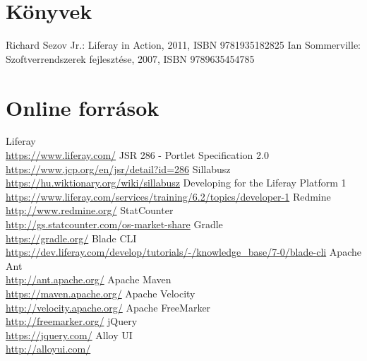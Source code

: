 \documentclass[hidelinks, 12pt, a4paper]{report}
\begin{document}

\clearpage
{}
\begin{thebibliography}{10}

\section*{Könyvek}

 Richard Sezov Jr.: Liferay in Action, 2011, ISBN 9781935182825
 Ian Sommerville: Szoftverrendszerek fejlesztése, 2007, ISBN 9789635454785

\section*{Online források}

 Liferay \\ \small\url{https://www.liferay.com/}
 JSR 286 - Portlet Specification 2.0 \\ \small\url{https://www.jcp.org/en/jsr/detail?id=286}
 Sillabusz \\ \small\url{https://hu.wiktionary.org/wiki/sillabusz}
 Developing for the Liferay Platform 1 \\ \small\url{https://www.liferay.com/services/training/6.2/topics/developer-1}
 Redmine \\ \small\url{http://www.redmine.org/}
 StatCounter \\ \small\url{http://gs.statcounter.com/os-market-share}
 Gradle \\ \small\url{https://gradle.org/}
 Blade CLI \\ \small\url{https://dev.liferay.com/develop/tutorials/-/knowledge_base/7-0/blade-cli}
 Apache Ant \\ \small\url{http://ant.apache.org/}
 Apache Maven \\ \small\url{https://maven.apache.org/}
 Apache Velocity \\ \small\url{http://velocity.apache.org/}
 Apache FreeMarker \\ \small\url{http://freemarker.org/}
 jQuery \\ \small\url{https://jquery.com/}
 Alloy UI \\ \small\url{http://alloyui.com/}

\end{thebibliography}
\end{document}
